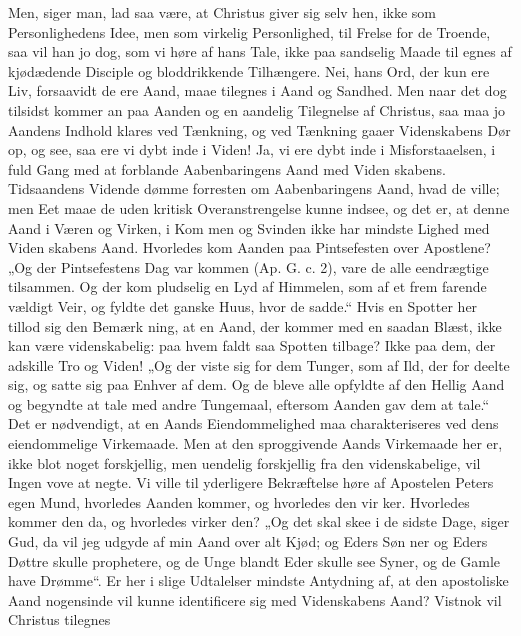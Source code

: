 \documentclass[12pt]{book}
\newcommand{\opage}[1]{\marginnote{\footnotesize\textit{[#1]}}}
\begin{document}
Men, siger man, lad saa være, at Christus giver sig
selv hen, ikke som Personlighedens Idee, men som virkelig
Personlighed, til Frelse for de Troende, saa vil han jo dog,
\opage{76}\setcounter{footnote}{0}%
som vi høre af hans Tale, ikke paa sandselig Maade til\-%
egnes af kjødædende Disciple og bloddrikkende Tilhængere.
Nei, hans Ord, der kun ere Liv, forsaavidt de ere Aand,
maae tilegnes i Aand og Sandhed. Men naar det dog
tilsidst kommer an paa Aanden og en aandelig Tilegnelse
af Christus, saa maa jo Aandens Indhold klares ved
Tænkning, og ved Tænkning gaaer Videnskabens Dør
op, og see, saa ere vi dybt inde i Viden! Ja, vi
ere dybt inde i Misforstaaelsen, i fuld Gang med
at forblande Aabenbaringens Aand med Viden\-%
skabens. Tidsaandens Vidende dømme forresten
om Aabenbaringens Aand, hvad de ville; men Eet
maae de uden kritisk Overanstrengelse kunne indsee,
og det er, at denne Aand i Væren og Virken, i Kom\-%
men og Svinden ikke har mindste Lighed med Viden\-%
skabens Aand. Hvorledes kom Aanden paa Pintsefesten
over Apostlene? „Og der Pintsefestens Dag var kommen
(Ap. G. c. 2), vare de alle eendrægtige tilsammen. Og
der kom pludselig en Lyd af Himmelen, som af et frem\-%
farende vældigt Veir, og fyldte det ganske Huus, hvor
de sadde.“ Hvis en Spotter her tillod sig den Bemærk\-%
ning, at en Aand, der kommer med en saadan Blæst,
ikke kan være videnskabelig: paa hvem faldt saa Spotten
tilbage? Ikke paa dem, der adskille Tro og Viden!
„Og der viste sig for dem Tunger, som af Ild, der for\-%
deelte sig, og satte sig paa Enhver af dem. Og de bleve
alle opfyldte af den Hellig Aand og begyndte at tale
med andre Tungemaal, eftersom Aanden gav dem at
tale.“ Det er nødvendigt, at en Aands Eiendommelighed
maa charakteriseres ved dens eiendommelige Virkemaade.
Men at den sproggivende Aands Virkemaade her er,
ikke blot noget forskjellig, men uendelig forskjellig fra
den videnskabelige, vil Ingen vove at negte. Vi ville til
yderligere Bekræftelse høre af Apostelen Peters egen
\opage{77}\setcounter{footnote}{0}%
Mund, hvorledes Aanden kommer, og hvorledes den vir\-%
ker. Hvorledes kommer den da, og hvorledes virker den?
„Og det skal skee i de sidste Dage, siger Gud, da vil
jeg udgyde af min Aand over alt Kjød; og Eders Søn\-%
ner og Eders Døttre skulle prophetere, og de Unge
blandt Eder skulle see Syner, og de Gamle have Drømme“.
Er her i slige Udtalelser mindste Antydning af, at den
apostoliske Aand nogensinde vil kunne identificere sig
med Videnskabens Aand? Vistnok vil Christus tilegnes
\end{document}
